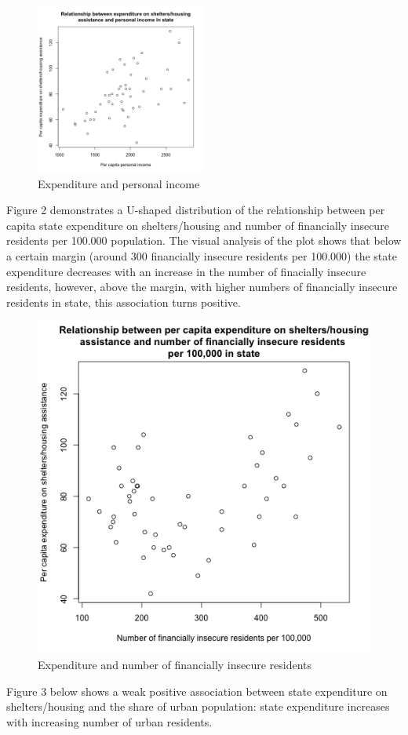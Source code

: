 \documentclass[12pt,letterpaper]{article}
\begin{document}
\begin{figure}[h!]\centering
	\caption{\footnotesize Expenditure and personal income}
	\label{fig:plot_1}
	\includegraphics[width=0.5\textwidth]{scatterplot_y_x1.png}
\end{figure}

\noindent Figure 2 demonstrates a U-shaped distribution of the relationship between per capita state expenditure on shelters/housing and number of financially  insecure residents per 100.000 population. The visual analysis of the plot shows that below a certain margin (around 300 financially insecure residents per 100.000) the state expenditure decreases with an increase in the number of finacially insecure residents, however, above the margin, with higher numbers of financially insecure residents in state, this association turns positive. 

\begin{figure}[h!]\centering
	\caption{\footnotesize Expenditure and number of financially insecure residents}
	\label{fig:plot_2}
	\includegraphics[width=.5\textwidth]{scatterplot_y_x2.png}
\end{figure}

\vspace{.2cm}
\noindent Figure 3 below shows a weak positive association between state expenditure on shelters/housing and the share of urban population: state expenditure increases with increasing number of urban residents. \\
\end{document}
